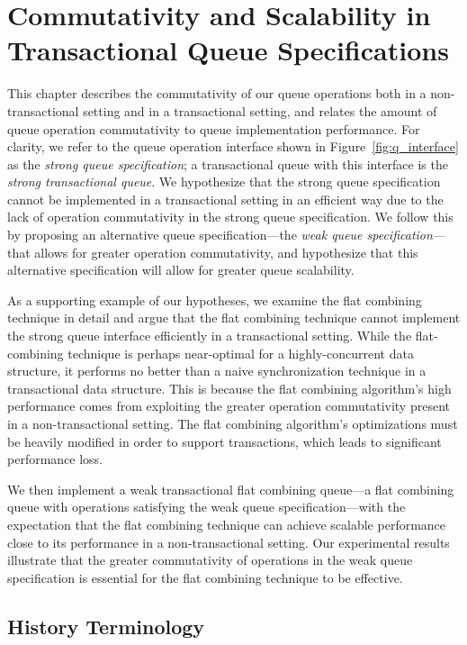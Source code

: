 \chapter{Commutativity and Scalability in Transactional Queue Specifications}
\label{commutativity}

This chapter describes the commutativity of our queue operations both in a non-transactional setting and in a transactional setting, and relates the amount of queue operation commutativity to queue implementation performance. For clarity, we refer to the queue operation interface shown in Figure~\ref{fig:q_interface} as the \emph{strong queue specification}; a transactional queue with this interface is the \emph{strong transactional queue}. We hypothesize that the strong queue specification cannot be implemented in a transactional setting in an efficient way due to the lack of operation commutativity in the strong queue specification. 
We follow this by proposing an alternative queue specification---the \emph{weak queue specification}---that allows for greater operation commutativity, and hypothesize that this alternative specification will allow for greater queue scalability.

As a supporting example of our hypotheses, we examine the flat combining technique in detail and argue that the flat combining technique cannot implement the strong queue interface efficiently in a transactional setting. While the flat-combining technique is perhaps near-optimal for a highly-concurrent data structure, it performs no better than a naive synchronization technique in a transactional data structure. This is because the flat combining algorithm's high performance comes from exploiting the greater operation commutativity present in a non-transactional setting. The flat combining algorithm's optimizations must be heavily modified in order to support transactions, which leads to significant performance loss. 

We then implement a weak transactional flat combining queue---a flat combining queue with operations satisfying the weak queue specification---with the expectation that the flat combining technique can achieve scalable performance close to its performance in a non-transactional setting. Our experimental results illustrate that the greater commutativity of operations in the weak queue specification is essential for the flat combining technique to be effective.

\section{History Terminology}

